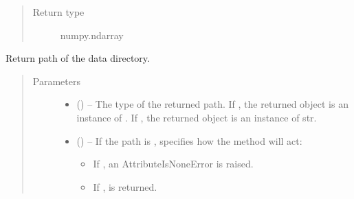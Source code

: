 \documentclass[letterpaper,10pt,english]{sphinxmanual}
\begin{document}
\begin{fulllineitems}
\begin{fulllineitems}
\begin{quote}
\begin{description}
\item[{Return type}] \leavevmode
\sphinxAtStartPar
numpy.ndarray

\end{description}\end{quote}

\end{fulllineitems}


\begin{fulllineitems}
\label{\detokenize{references/core:nmrespy.core.Estimator.get_datapath}}
\sphinxAtStartPar
Return path of the data directory.
\begin{quote}\begin{description}
\item[{Parameters}] \leavevmode\begin{itemize}
\item {} 
\sphinxAtStartPar
{} (\sphinxstyleliteralemphasis{\sphinxupquote{, }}) – The type of the returned path. If , the returned object
is an instance of . If , the returned
object is an instance of str.

\item {} 
\sphinxAtStartPar
{} (\sphinxstyleliteralemphasis{\sphinxupquote{, }}) – 
\sphinxAtStartPar
If the path is ,  specifies how the method will act:
\begin{itemize}
\item {} 
\sphinxAtStartPar
If , an AttributeIsNoneError is raised.

\item {} 
\sphinxAtStartPar
If ,  is returned.


\end{itemize}
\end{itemize}
\end{description}
\end{quote}
\end{fulllineitems}
\end{fulllineitems}
\end{document}
